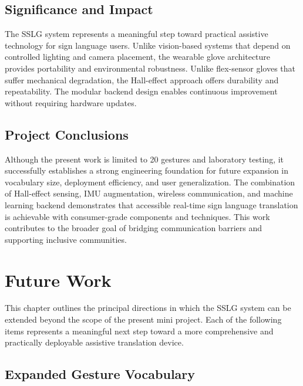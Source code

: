 \documentclass[12pt,a4paper]{report}
\begin{document}
\section{Significance and Impact}
\label{sec:concl_significance}

The SSLG system represents a meaningful step toward practical assistive technology for sign language users. Unlike vision-based systems that depend on controlled lighting and camera placement, the wearable glove architecture provides portability and environmental robustness. Unlike flex-sensor gloves that suffer mechanical degradation, the Hall-effect approach offers durability and repeatability. The modular backend design enables continuous improvement without requiring hardware updates.

\section{Project Conclusions}
\label{sec:concl_final}

Although the present work is limited to 20 gestures and laboratory testing, it successfully establishes a strong engineering foundation for future expansion in vocabulary size, deployment efficiency, and user generalization. The combination of Hall-effect sensing, IMU augmentation, wireless communication, and machine learning backend demonstrates that accessible real-time sign language translation is achievable with consumer-grade components and techniques. This work contributes to the broader goal of bridging communication barriers and supporting inclusive communities.


\chapter{Future Work}

This chapter outlines the principal directions in which the SSLG system can be extended beyond the scope of the present mini project. Each of the following items represents a meaningful next step toward a more comprehensive and practically deployable assistive translation device.

\section{Expanded Gesture Vocabulary}
\label{sec:future_vocabulary}
\end{document}
